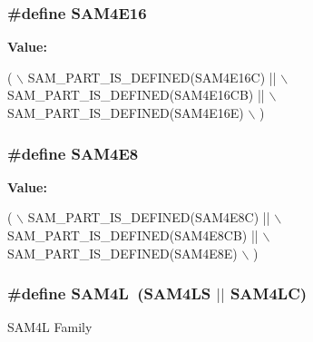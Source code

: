 \subsubsection[{S\+A\+M4\+E16}]{\setlength{\rightskip}{0pt plus 5cm}\#define S\+A\+M4\+E16}\label{group__sam__part__macros__group_ga7e756ab3c18b6c54de1d7f376e13eaa3}
{\bfseries Value\+:}
\begin{DoxyCode}
( \(\backslash\)
        SAM\_PART\_IS\_DEFINED(SAM4E16C) || \(\backslash\)
        SAM\_PART\_IS\_DEFINED(SAM4E16CB) || \(\backslash\)
        SAM\_PART\_IS\_DEFINED(SAM4E16E) \(\backslash\)
        )
\end{DoxyCode}
\hypertarget{group__sam__part__macros__group_ga698232ea02e61922d22e02b339796a50}{}
\subsubsection[{S\+A\+M4\+E8}]{\setlength{\rightskip}{0pt plus 5cm}\#define S\+A\+M4\+E8}\label{group__sam__part__macros__group_ga698232ea02e61922d22e02b339796a50}
{\bfseries Value\+:}
\begin{DoxyCode}
( \(\backslash\)
        SAM\_PART\_IS\_DEFINED(SAM4E8C) || \(\backslash\)
        SAM\_PART\_IS\_DEFINED(SAM4E8CB) || \(\backslash\)
        SAM\_PART\_IS\_DEFINED(SAM4E8E) \(\backslash\)
        )
\end{DoxyCode}
\hypertarget{group__sam__part__macros__group_gabf4b4fa802cbb57480225dd3c8f7a41b}{}
\subsubsection[{S\+A\+M4\+L}]{\setlength{\rightskip}{0pt plus 5cm}\#define S\+A\+M4\+L~(S\+A\+M4\+L\+S $\vert$$\vert$ S\+A\+M4\+L\+C)}\label{group__sam__part__macros__group_gabf4b4fa802cbb57480225dd3c8f7a41b}
S\+A\+M4\+L Family \hypertarget{group__sam__part__macros__group_gaff053c1dc2a1aaf1e97428da4cb49704}{}
